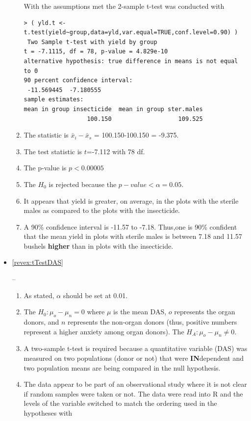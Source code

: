 \documentclass[10pt,openany]{book}\usepackage[]{graphicx}\usepackage[]{color}
\makeatletter
\newenvironment{kframe}{%
 \def\at@end@of@kframe{}%
 \ifinner\ifhmode%
  \def\at@end@of@kframe{\end{minipage}}%
  \begin{minipage}{\columnwidth}%
 \fi\fi%
 \def\FrameCommand##1{\hskip\@totalleftmargin \hskip-\fboxsep
 \colorbox{shadecolor}{##1}\hskip-\fboxsep
     \hskip-\linewidth \hskip-\@totalleftmargin \hskip\columnwidth}%
 \MakeFramed {\advance\hsize-\width
   \@totalleftmargin\z@ \linewidth\hsize
   \@setminipage}}%
 {\par\unskip\endMakeFramed%
 \at@end@of@kframe}
\newenvironment{knitrout}{}{} %
\makeatother
\begin{document}
\begin{itemize}
\begin{enumerate}
With the assumptions met the 2-sample t-test was conducted with
\begin{knitrout}
\color{fgcolor}\begin{kframe}
\begin{verbatim}
> ( yld.t <- t.test(yield~group,data=yld,var.equal=TRUE,conf.level=0.90) )
 Two Sample t-test with yield by group 
t = -7.1115, df = 78, p-value = 4.829e-10
alternative hypothesis: true difference in means is not equal to 0 
90 percent confidence interval:
 -11.569445  -7.180555 
sample estimates:
mean in group insecticide  mean in group ster.males 
                  100.150                   109.525 
\end{verbatim}
\end{kframe}
\end{knitrout}
      \item The statistic is $\bar{x}_{i}-\bar{x}_{s}$ = 100.150-100.150 = -9.375.
      \item The test statistic is $t$=-7.112 with 78 df.
      \item The p-value is $p<0.00005$
       \item The $H_{0}$ is rejected because the $p-value <\alpha=0.05$.
      \item It appears that yield is greater, on average, in the plots with the sterile males as compared to the plots with the insecticide.
      \item A 90\% confidence interval is -11.57 to -7.18.  Thus,one is 90\% confident that the mean yield in plots with sterile males is between 7.18 and 11.57 bushels \textbf{higher} than in plots with the insecticide.
    \end{enumerate}
  \item \hypertarget{ans:tTestDAS}{\ref{revex:tTestDAS}} --
    \begin{enumerate}
      \item As stated, $\alpha$ should be set at 0.01.
      \item The $H_{0}:\mu_{o}-\mu_{n}=0$ where $\mu$ is the mean DAS, $o$ represents the organ donors, and $n$ represents the non-organ donors (thus, positive numbers represent a higher anxiety among organ donors).  The $H_{A}:\mu_{o}-\mu_{n}\neq0$.
      \item A two-sample t-test is required because a quantitative variable (DAS) was measured on two populations (donor or not) that were \textbf{IN}dependent and two population means are being compared in the null hypothesis.
      \item The data appear to be part of an observational study where it is not clear if random samples were taken or not.  The data were read into R and the levels of the  variable switched to match the ordering used in the hypotheses with

\end{enumerate}
\end{itemize}
\end{document}
